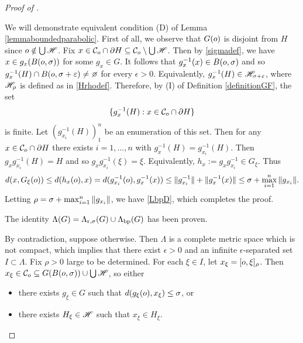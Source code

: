 \begin{proof}[Proof of ]
\begin{subproof}[Proof that $\Lambda(G) = \Lrsigma(G) \cup \Lbp(G)$ for some $\sigma > 0$]
\begin{subproof}
We will demonstrate equivalent condition (D) of Lemma \ref{lemmaboundedparabolic}. First of all, we observe that $G(o)$ is disjoint from $H$ since $o\notin\bigcup\mathscr H$. Fix $x\in\mathcal C_o\cap\partial H \subseteq \mathcal C_o\setminus\bigcup\mathscr H$. Then by \eqref{sigmadef}, we have $x\in g_x(B(o,\sigma))$ for some $g_x\in G$. It follows that $g_x^{-1}(x)\in B(o,\sigma)$ and so $g_x^{-1}(H) \cap B(\zero,\sigma + \epsilon) \neq \emptyset$ for every $\epsilon >0$. Equivalently, $g_x^{-1}(H)\in\mathscr H_{\sigma + \varepsilon}$, where $\mathscr H_\rho$ is defined as in \eqref{Hrhodef}. Therefore, by (I) of Definition \ref{definitionGF}, the set
\[
\{g_x^{-1}(H) : x\in \mathcal C_o\cap\partial H\}
\]
is finite. Let $(g_{x_i}^{-1}(H))_1^n$ be an enumeration of this set. Then for any $x\in\mathcal C_o\cap\partial H$ there exists $i = 1,\ldots,n$ with $g_x^{-1}(H) = g_{x_i}^{-1}(H)$. Then $g_x g_{x_i}^{-1} (H) = H$ and so $g_x g_{x_i}^{-1}(\xi) = \xi$. Equivalently, $h_x := g_x g_{x_i}^{-1}\in G_\xi$. Thus
\[
d(x,G_\xi(o)) \leq d(h_x(o), x) = d(g_{x_i}^{-1}(o),g_x^{-1}(x)) \leq \|g_{x_i}^{-1}\| + \|g_x^{-1}(x)\| \leq \sigma + \max_{i = 1}^n \|g_{x_i}\|.
\]
Letting $\rho = \sigma + \max_{i = 1}^n \|g_{x_i}\|$, we have \eqref{LbpD}, which completes the proof.
\end{subproof}
\noindent The identity $\Lambda(G) = \Lrsigma(G) \cup \Lbp(G)$ has been proven.
\end{subproof}

\begin{subproof}
By contradiction, suppose otherwise. Then $\Lambda$ is a complete metric space which is not compact, which implies that there exist $\epsilon > 0$ and an infinite $\epsilon$-separated set $I\subset\Lambda$. Fix $\rho > 0$ large to be determined. For each $\xi\in I$, let $x_\xi = [o,\xi]_\rho$. Then $x_\xi\in\mathcal C_o \subseteq G(B(o,\sigma)) \cup \bigcup\mathscr H$, so either
\begin{itemize}
\item[(1)] there exists $g_\xi\in G$ such that $d(g_\xi(o),x_\xi)\leq \sigma$, or
\item[(2)] there exists $H_\xi\in\mathscr H$ such that $x_\xi\in H_\xi$.
\end{itemize}


\end{subproof}
\end{proof}
